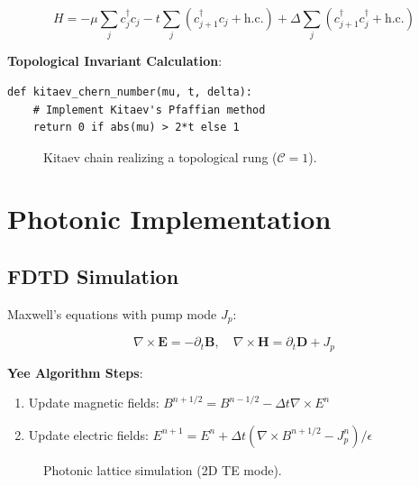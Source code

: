 \documentclass[12pt]{article}
\theoremstyle{plain}
\begin{document}
\begin{equation}
    H = -\mu\sum_j c_j^\dagger c_j - t\sum_j (c_{j+1}^\dagger c_j + \text{h.c.}) 
         + \Delta\sum_j (c_{j+1}^\dagger c_j^\dagger + \text{h.c.})
\end{equation}

\textbf{Topological Invariant Calculation}:
\begin{verbatim}
def kitaev_chern_number(mu, t, delta):
    # Implement Kitaev's Pfaffian method
    return 0 if abs(mu) > 2*t else 1
\end{verbatim}

\begin{figure}[h]
    \centering
    \caption{Kitaev chain realizing a topological rung ($\mathcal{C}=1$).}
\end{figure}

\section{Photonic Implementation}

\subsection{FDTD Simulation}
Maxwell's equations with pump mode $J_p$:

\begin{equation}
    \nabla\times\mathbf{E} = -\partial_t\mathbf{B}, \quad \nabla\times\mathbf{H} = \partial_t\mathbf{D} + J_p
\end{equation}

\textbf{Yee Algorithm Steps}:
\begin{enumerate}
    \item Update magnetic fields: $B^{n+1/2} = B^{n-1/2} - \Delta t \nabla\times E^n$
    \item Update electric fields: $E^{n+1} = E^n + \Delta t (\nabla\times B^{n+1/2} - J_p^n)/\epsilon$
\end{enumerate}

\begin{figure}[h]
    \centering
    \caption{Photonic lattice simulation (2D TE mode).}
\end{figure}
\end{document}
